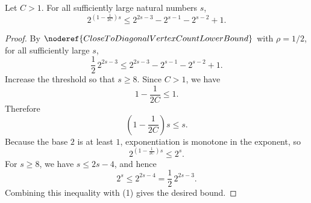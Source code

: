 \begin{helper}
Let \(C>1\).  For all sufficiently large natural numbers \(s\),
\[
  2^{(1-\frac{1}{2C})s}
  \le
  2^{2s-3}-2^{s-1}-2^{s-2}+1.
\]
\end{helper}
\begin{proof}
By \(\noderef{CloseToDiagonalVertexCountLowerBound}\) with
\(\rho=1/2\), for all sufficiently large \(s\),
\[
  \frac12\,2^{2s-3}
  \le
  2^{2s-3}-2^{s-1}-2^{s-2}+1. \tag{1}
\]
Increase the threshold so that \(s\ge8\).  Since \(C>1\), we have
\[
  1-\frac{1}{2C}\le 1.
\]
Therefore
\[
  (1-\frac{1}{2C})s\le s.
\]
Because the base \(2\) is at least \(1\), exponentiation is monotone in the
exponent, so
\[
  2^{(1-\frac{1}{2C})s}\le 2^s.
\]
For \(s\ge8\), we have \(s\le2s-4\), and hence
\[
  2^s\le2^{2s-4}=\frac12\,2^{2s-3}.
\]
Combining this inequality with (1) gives the desired bound.
\end{proof}
